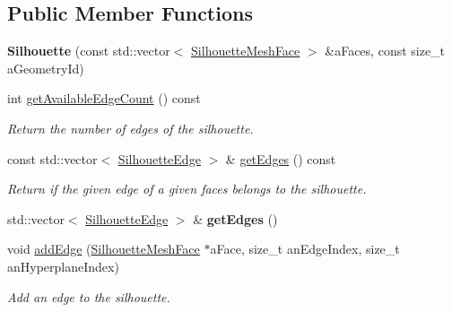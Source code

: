 \subsection*{Public Member Functions}
\begin{DoxyCompactItemize}
\item 
\mbox{\label{classvisilib_1_1_silhouette_a878bc29cd61c6356be1988f8ee2cb2f4}} 
{\bfseries Silhouette} (const std\+::vector$<$ \mbox{\hyperlink{classvisilib_1_1_silhouette_mesh_face}{Silhouette\+Mesh\+Face}} $>$ \&a\+Faces, const size\+\_\+t a\+Geometry\+Id)
\item 
\mbox{\label{classvisilib_1_1_silhouette_abf0ef623ba45072e7dfd804d481ff91e}} 
int \mbox{\hyperlink{classvisilib_1_1_silhouette_abf0ef623ba45072e7dfd804d481ff91e}{get\+Available\+Edge\+Count}} () const
\begin{DoxyCompactList}\small\item\em Return the number of edges of the silhouette. \end{DoxyCompactList}\item 
const std\+::vector$<$ \mbox{\hyperlink{structvisilib_1_1_silhouette_edge}{Silhouette\+Edge}} $>$ \& \mbox{\hyperlink{classvisilib_1_1_silhouette_a71ef8585c5f017de2a5af97d870b12c7}{get\+Edges}} () const
\begin{DoxyCompactList}\small\item\em Return if the given edge of a given faces belongs to the silhouette. \end{DoxyCompactList}\item 
\mbox{\label{classvisilib_1_1_silhouette_a720f0bf03ab4668111475e1260231958}} 
std\+::vector$<$ \mbox{\hyperlink{structvisilib_1_1_silhouette_edge}{Silhouette\+Edge}} $>$ \& {\bfseries get\+Edges} ()
\item 
\mbox{\label{classvisilib_1_1_silhouette_a64735427a7ab9ae48d9d2b4f16230868}} 
void \mbox{\hyperlink{classvisilib_1_1_silhouette_a64735427a7ab9ae48d9d2b4f16230868}{add\+Edge}} (\mbox{\hyperlink{classvisilib_1_1_silhouette_mesh_face}{Silhouette\+Mesh\+Face}} $\ast$a\+Face, size\+\_\+t an\+Edge\+Index, size\+\_\+t an\+Hyperplane\+Index)
\begin{DoxyCompactList}\small\item\em Add an edge to the silhouette. \end{DoxyCompactList}\item 

\end{DoxyCompactItemize}
